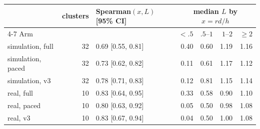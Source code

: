 \begin{tabular}{@{}l r l r r r r@{}}
\toprule
 & clusters & Spearman$(x,L)$ [95\% CI] & \multicolumn{4}{c}{median $L$ by $x=rd/h$} \\
\cmidrule(lr){4-7}
Arm & & & $<.5$ & $.5$--$1$ & $1$--$2$ & $\ge 2$ \\
\midrule
simulation, full & 32 & 0.69 [0.55, 0.81] & 0.40 & 0.60 & 1.19 & 1.16 \\
simulation, paced & 32 & 0.73 [0.62, 0.82] & 0.11 & 0.61 & 1.17 & 1.12 \\
simulation, v3 & 32 & 0.78 [0.71, 0.83] & 0.12 & 0.81 & 1.15 & 1.14 \\
real, full & 10 & 0.83 [0.64, 0.95] & 0.33 & 0.58 & 0.90 & 1.10 \\
real, paced & 10 & 0.80 [0.63, 0.92] & 0.05 & 0.50 & 0.98 & 1.08 \\
real, v3 & 10 & 0.83 [0.67, 0.94] & 0.04 & 0.50 & 1.00 & 1.08 \\
\bottomrule
\end{tabular}
